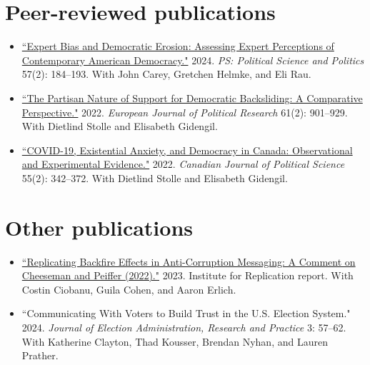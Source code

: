 \documentclass[margin, 10pt]{res}
\begin{document}
\begin{resume}
\section{Peer-reviewed publications}
\begin{itemize}

	\item \href{https://www.cambridge.org/core/journals/ps-political-science-and-politics/article/expert-bias-and-democratic-erosion-assessing-expert-perceptions-of-contemporary-american-democracy/0620719DD8C8A4FE1055AF268A3732E0}{``Expert Bias and Democratic Erosion: Assessing Expert Perceptions of Contemporary American Democracy."}  2024.  \textit{PS: Political Science and Politics} 57(2): 184--193. With John Carey, Gretchen Helmke, and Eli Rau.

	\item \href{https://ejpr.onlinelibrary.wiley.com/doi/10.1111/1475-6765.12502}{``The Partisan Nature of Support for Democratic Backsliding: A Comparative Perspective."} 2022. \textit{European Journal of Political Research} 61(2): 901--929. With Dietlind Stolle and Elisabeth Gidengil.

	\item \href{https://www.cambridge.org/core/journals/canadian-journal-of-political-science-revue-canadienne-de-science-politique/article/covid19-and-support-for-executive-aggrandizement/51E9E60701AAEF93C01EB3D2E8BE0A69}{``COVID-19, Existential Anxiety, and Democracy in Canada: Observational and Experimental Evidence."} 2022. \textit{Canadian Journal of Political Science} 55(2): 342--372. With Dietlind Stolle and Elisabeth Gidengil.

\end{itemize}

\section{Other publications}
\begin{itemize}

	\item \href{https://ideas.repec.org/p/zbw/i4rdps/94.html}{``Replicating Backfire Effects in Anti-Corruption Messaging: A Comment on Cheeseman and Peiffer (2022)."}  2023. Institute for Replication report. With Costin Ciobanu, Guila Cohen, and Aaron Erlich.

	\item ``Communicating With Voters to Build Trust in the U.S. Election System." 2024. \textit{Journal of Election Administration, Research and Practice} 3: 57--62. With Katherine Clayton, Thad Kousser, Brendan Nyhan, and Lauren Prather.


\end{itemize}
\end{resume}
\end{document}

